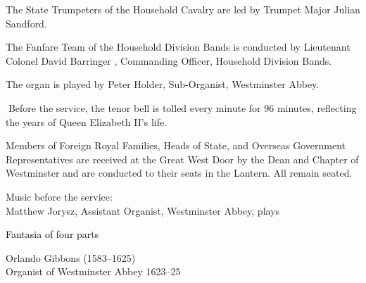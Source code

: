 \vspace*{.5in}


The State Trumpeters of the Household Cavalry are led by Trumpet Major Julian Sandford.

The Fanfare Team of the Household Division Bands is conducted by Lieutenant Colonel David
Barringer , Commanding Officer, Household Division Bands.

\vspace*{.5in}

The organ is played by Peter Holder, Sub-Organist, Westminster Abbey.


Before the service, the tenor bell is tolled every minute for 96 minutes, reflecting the years of
Queen Elizabeth II’s life.

\vspace*{.15in}

Members of Foreign Royal Families, Heads of State, and Overseas Government Representatives are
received at the Great West Door by the Dean and Chapter of Westminster and are conducted to their seats in the Lantern. All remain seated.

\vspace*{.15in}

Music before the service:\\%
Matthew Jorysz, Assistant Organist, Westminster Abbey, plays


  \begin{minipage}[t]{0.5\textwidth}
    \begin{flushleft}
\textcolor{black}{\normalfont%
Fantasia of four parts}
\end{flushleft}
\end{minipage}%
%
\begin{minipage}[t]{0.5\textwidth}
    \begin{flushright}
Orlando Gibbons (1583–1625)\\Organist of Westminster Abbey 1623–25
    \end{flushright}
\end{minipage}








